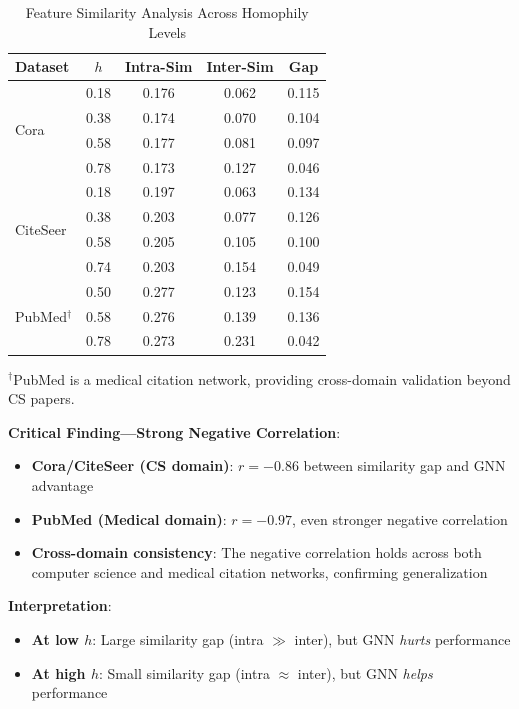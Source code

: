 \begin{table}[t]
\centering
\caption{Feature Similarity Analysis Across Homophily Levels}
\label{tab:feature_similarity}
\begin{tabular}{@{}lcccc@{}}
\toprule
\textbf{Dataset} & \textbf{$h$} & \textbf{Intra-Sim} & \textbf{Inter-Sim} & \textbf{Gap} \\
\midrule
\multirow{4}{*}{Cora} & 0.18 & 0.176 & 0.062 & 0.115 \\
 & 0.38 & 0.174 & 0.070 & 0.104 \\
 & 0.58 & 0.177 & 0.081 & 0.097 \\
 & 0.78 & 0.173 & 0.127 & 0.046 \\
\midrule
\multirow{4}{*}{CiteSeer} & 0.18 & 0.197 & 0.063 & 0.134 \\
 & 0.38 & 0.203 & 0.077 & 0.126 \\
 & 0.58 & 0.205 & 0.105 & 0.100 \\
 & 0.74 & 0.203 & 0.154 & 0.049 \\
\midrule
\multirow{3}{*}{PubMed$^\dag$} & 0.50 & 0.277 & 0.123 & 0.154 \\
 & 0.58 & 0.276 & 0.139 & 0.136 \\
 & 0.78 & 0.273 & 0.231 & 0.042 \\
\bottomrule
\end{tabular}
\vspace{1mm}
\raggedright\small $^\dag$PubMed is a medical citation network, providing cross-domain validation beyond CS papers.
\end{table}

\textbf{Critical Finding---Strong Negative Correlation}:
\begin{itemize}
    \item \textbf{Cora/CiteSeer (CS domain)}: $r = -0.86$ between similarity gap and GNN advantage
    \item \textbf{PubMed (Medical domain)}: $r = -0.97$, even stronger negative correlation
    \item \textbf{Cross-domain consistency}: The negative correlation holds across both computer science and medical citation networks, confirming generalization
\end{itemize}

\textbf{Interpretation}:
\begin{itemize}
    \item \textbf{At low $h$}: Large similarity gap (intra $\gg$ inter), but GNN \textit{hurts} performance
    \item \textbf{At high $h$}: Small similarity gap (intra $\approx$ inter), but GNN \textit{helps} performance
\end{itemize}

